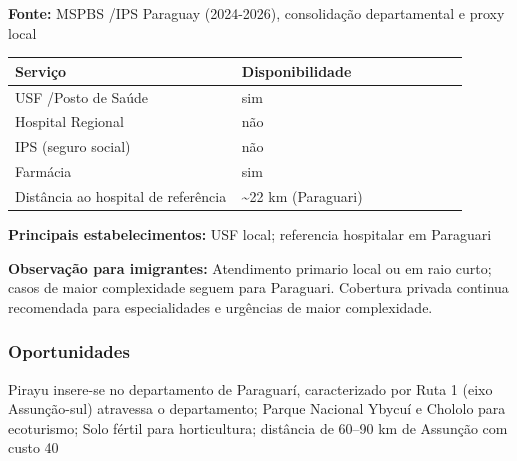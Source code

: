 \textbf{Fonte:} MSPBS /\allowbreak  IPS Paraguay (2024-2026), consolidação
departamental e proxy local

{\def\LTcaptype{none} %
\begin{longtable}{@{}>{\raggedright\arraybackslash}p{0.45\linewidth} >{\raggedright\arraybackslash}p{0.45\linewidth}@{}}
\toprule\noalign{}
Serviço & Disponibilidade \\
\midrule\noalign{}
\endhead
\bottomrule\noalign{}
\endlastfoot
USF /\allowbreak  Posto de Saúde & sim \\
Hospital Regional & não \\
IPS (seguro social) & não \\
Farmácia & sim \\
Distância ao hospital de referência & \textasciitilde22 km
(Paraguari) \\
\end{longtable}
}

\textbf{Principais estabelecimentos:} USF local; referencia hospitalar
em Paraguari

\textbf{Observação para imigrantes:} Atendimento primario local ou em
raio curto; casos de maior complexidade seguem para Paraguari. Cobertura
privada continua recomendada para especialidades e urgências de maior
complexidade.
\newpage

\subsubsection*{Oportunidades}\label{oport-pirayu-0909}
Pirayu insere-se no departamento de Paraguarí, caracterizado por Ruta 1 (eixo Assunção-sul) atravessa o departamento; Parque Nacional Ybycuí e Chololo para ecoturismo; Solo fértil para horticultura; distância de 60–90 km de Assunção com custo 40%

